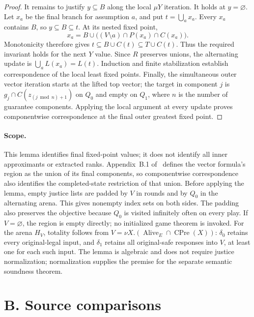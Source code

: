 \documentclass[11pt]{article}
\begin{document}
\begin{proof}
It remains to justify $y\subseteq B$ along the local $\mu Y$ iteration.
It holds at $y=\varnothing$. Let $x_a$ be the final branch for assumption
$a$, and put $t=\bigcup_a x_a$. Every $x_a$ contains $B$, so
$y\subseteq B\subseteq t$. At its nested fixed point,
\[
 x_a=B\cup\bigl((V\setminus a)\cap P(x_a)\cap C(x_a)\bigr).
\]
Monotonicity therefore gives
$t\subseteq B\cup C(t)\subseteq T\cup C(t)$.
Thus the required invariant holds for the next $Y$ value. Since $R$
preserves unions, the alternating update is
$\bigcup_a L(x_a)=L(t)$. Induction and finite stabilization establish
correspondence of the local least fixed points. Finally, the simultaneous
outer vector iteration starts at the lifted top vector; the target in
component $j$ is $g_j\cap C(z_{(j\bmod n)+1})$ on $Q_0$ and empty on $Q_1$,
where $n$ is the number of guarantee components.
Applying the local argument at every update proves componentwise
correspondence at the final outer greatest fixed point.
\end{proof}

\paragraph{Scope.}
This lemma identifies final fixed-point values; it does not identify all
inner approximants or extracted ranks. Appendix~B.1 of~\cite{friendly}
defines the vector formula's region as the union of its final components,
so componentwise correspondence also identifies the completed-state
restriction of that union. Before applying the lemma, empty
justice lists are padded by $V$ in rounds and by $Q_0$ in the alternating
arena. This gives nonempty index sets on both sides. The padding also
preserves the objective because $Q_0$ is visited infinitely often on
every play. If $V=\varnothing$, the region is empty directly; no initialized
game theorem is invoked. For the arena $H_V$, totality
follows from $V=\nu X.(\operatorname{Alive}_E\cap\operatorname{CPre}(X))$:
$\delta_0$ retains every original-legal input, and $\delta_1$ retains all
original-safe responses into $V$, at least one for each such input.
The lemma is algebraic and does not require justice normalization;
normalization supplies the premise for the separate semantic
soundness theorem.

\section*{B. Source comparisons}
\end{document}
